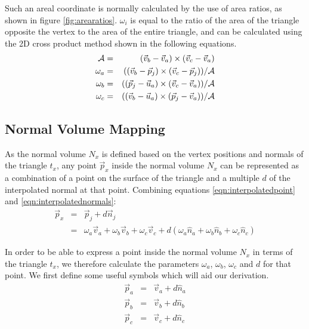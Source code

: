 Such an areal coordinate is normally calculated by the use of area ratios, as shown in figure \ref{fig:arearatios}. $\omega_i$ is equal to the ratio of the area of the triangle opposite the vertex to the area of the entire triangle, and can be calculated using the 2D cross product method shown in the following equations.
\begin{eqnarray}
{\cal A} & = & (\vec{v}_b - \vec{v}_a) \times (\vec{v}_c - \vec{v}_a) \\
\omega_a & = & ((\vec{v}_b - \vec{p}_j) \times (\vec{v}_c - \vec{p}_j)) / {\cal A} \\
\omega_b & = & ((\vec{p}_j - \vec{u}_a) \times (\vec{v}_c - \vec{v}_a)) / {\cal A} \\
\omega_c & = & ((\vec{v}_b - \vec{u}_a) \times (\vec{p}_j - \vec{v}_a)) / {\cal A}
\end{eqnarray}

\subsection{\label{sec:scandata:pointtosurface:nvmapping}Normal Volume Mapping}

As the normal volume $N_x$ is defined based on the vertex positions and normals of the triangle $t_x$, any point $\vec{p}_x$ inside the normal volume $N_x$ can be represented as a combination of a point on the surface of the triangle and a multiple $d$ of the interpolated normal at that point. Combining equations \ref{eqn:interpolatedpoint} and \ref{eqn:interpolatednormals}:
\begin{eqnarray} \label{eqn:pointinvolume}
\vec{p}_x & = & \vec{p}_j + d \vec{n}_j\nonumber \\
          & = & \omega_a\vec{v}_a + \omega_b\vec{v}_b + \omega_c\vec{v}_c + d(\omega_a\hat{n}_a+\omega_b\hat{n}_b+\omega_c\hat{n}_c)
\end{eqnarray}

In order to be able to express a point inside the normal volume $N_x$ in terms of the triangle $t_x$, we therefore calculate the parameters $\omega_a$, $\omega_b$, $\omega_c$ and $d$ for that point. We first define some useful symbols which will aid our derivation.
\begin{eqnarray} \label{eqn:pointsymbols}
\vec{p}_a & = & \vec{v}_a + d\hat{n}_a \nonumber \\
\vec{p}_b & = & \vec{v}_b + d\hat{n}_b \nonumber \\
\vec{p}_c & = & \vec{v}_c + d\hat{n}_c
\end{eqnarray}

